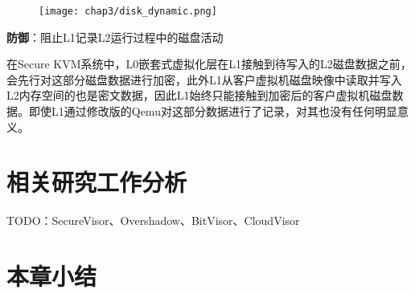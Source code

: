 \begin{figure}[!htbp]
  \centering
  \texttt{[image: chap3/disk\_dynamic.png]}
\end{figure}

\noindent
\textbf{防御\uppercase\expandafter{}}：阻止L1记录L2运行过程中的磁盘活动

在Secure KVM系统中，L0嵌套式虚拟化层在L1接触到待写入的L2磁盘数据之前，会先行对这部分磁盘数据进行加密，此外L1从客户虚拟机磁盘映像中读取并写入L2内存空间的也是密文数据，因此L1始终只能接触到加密后的客户虚拟机磁盘数据。即使L1通过修改版的Qemu对这部分数据进行了记录，对其也没有任何明显意义。

\section{相关研究工作分析}

TODO：SecureVisor、Overshadow、BitVisor、CloudVisor

\section{本章小结}
